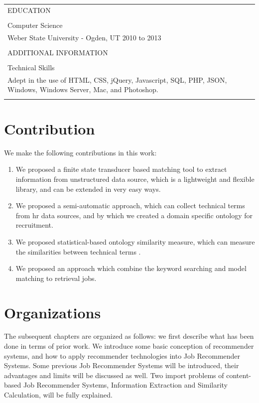 \begin{table}[!p]
\begin{tabular}{    |  p{15cm} |  }
\\
EDUCATION\\
\\
Computer Science \\
Weber State University - Ogden, UT 2010 to 2013 \\
\\
ADDITIONAL INFORMATION \\
\\
Technical Skills \\
Adept in the use of HTML, CSS, jQuery, Javascript, SQL, PHP, JSON, Windows, Windows Server, Mac, and Photoshop. \\

\\
\hline

\end{tabular}
\label{tab:resume} %
\end{table}


\section{Contribution}

We make the following contributions in this work:

\begin{enumerate}
    \item  We proposed a finite state transducer based matching tool to extract information from unstructured data source, which is a lightweight and flexible library, and can be extended in very easy ways.
    \item  We proposed a semi-automatic approach, which can collect technical terms from hr data sources, and by which we created a domain specific ontology for recruitment.
    \item  We proposed statistical-based ontology similarity measure, which can measure the similarities between technical terms .
    \item  We proposed an approach which combine the keyword searching and model matching to retrieval jobs.
\end{enumerate}

\section{Organizations}
The subsequent chapters are organized as follows: we first describe what has been done in terms of prior work.  We introduce some basic conception of recommender systems, and how to apply recommender technologies into Job Recommender Systems. Some previous Job Recommender Systems will be introduced,  their advantages and limits will be discussed as well.  Two import problems of content-based Job Recommender Systems, Information Extraction and Similarity Calculation, will be fully explained.


